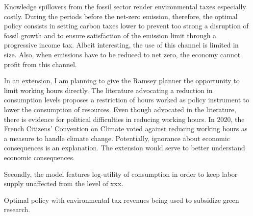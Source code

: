 Knowledge spillovers from the fossil sector render environmental taxes especially costly. 
During the periods before the net-zero emission, therefore, the optimal policy consists in setting carbon taxes lower to prevent too strong a disruption of fossil growth and to ensure satisfaction of the emission limit through a progressive income tax. Albeit interesting, the use of this channel is limited in size. Also, when emissions have to be reduced to net zero, the economy cannot profit from this channel. 

In an extension, I am planning to give the Ramsey planner the opportunity to limit working hours directly. The literature advocating a reduction in consumption levels \citep[e.g.,][]{Schor2005SustainableReductionb} proposes a restriction of hours worked as policy instrument to lower the consumption of resources.
Even though advocated in the literature, there is evidence for political difficulties in reducing working hours. In 2020, the French Citizens' Convention on Climate voted against reducing working hours as a measure to handle climate change. Potentially, ignorance about economic consequences is an explanation. The extension would serve to better understand economic consequences. 

Secondly, the model features log-utility of consumption in order to keep labor supply unaffected from the level of xxx. 

Optimal policy with environmental tax revenues being used to subsidize green research. 
